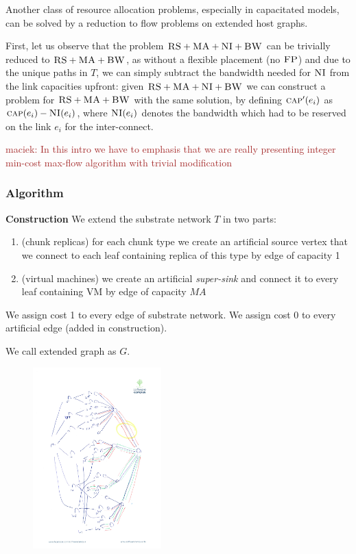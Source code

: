 \documentclass[9pt,twocolumn]{scrartcl}
\newcommand{\Capacity}{\ensuremath{\textsc{cap}}}
\newcommand{\maciek}[1]{\textcolor{brown}{maciek: #1}}
\newcommand{\SubstrateEdge}{\ensuremath{e}}
\newcommand{\CC}{\textsc{NI}}
\newcommand{\FP}{\textsc{FP}}
\newcommand{\RS}{\textsc{RS}}
\newcommand{\BW}{\textsc{BW}}
\newcommand{\MA}{\textsc{MA}}
\newcommand{\Tree}{\ensuremath{T}}
\begin{document}
Another class of resource allocation problems, especially in capacitated models,
can be solved by a reduction to flow
problems on extended host graphs.

First, let us observe that the problem $\RS+\MA+\CC+\BW$
can be trivially reduced to $\RS+\MA+\BW$, as without a flexible
placement (no $\FP$) and due to the unique paths in $\Tree$, we can simply subtract the bandwidth needed
for $\CC$ from the link capacities upfront: given $\RS+\MA+\CC+\BW$
we can construct a
problem for $\RS+\MA+\BW$ with the same solution, by defining
$\Capacity'(\SubstrateEdge_i)$ as
$\Capacity(\SubstrateEdge_i) - \CC(\SubstrateEdge_i)$, where
$\CC(\SubstrateEdge_i)$ denotes the bandwidth which
had to be reserved on the link $\SubstrateEdge_i$ for the 
inter-connect.

\maciek{In this intro we have to emphasis that we are really presenting integer min-cost max-flow algorithm with trivial modification}

\subsubsection{Algorithm}

\textbf{Construction}
We extend the substrate network $\Tree$ in two parts:
\begin{enumerate}
  \item (chunk replicas) for each chunk type we create an artificial source vertex that we connect to each leaf containing replica of this type by edge of capacity 1
  \item (virtual machines) we create an artificial \emph{super-sink} and connect it to every leaf containing VM by edge of capacity $MA$
\end{enumerate}

We assign cost 1 to every edge of substrate network. We assign cost 0 to every artificial edge (added in construction).

We call extended graph as $G$.

\begin{figure}
\includegraphics[angle=90,origin=c, height=7cm]{figs/model_fig_skteches/flow}
\end{figure}
\end{document}

